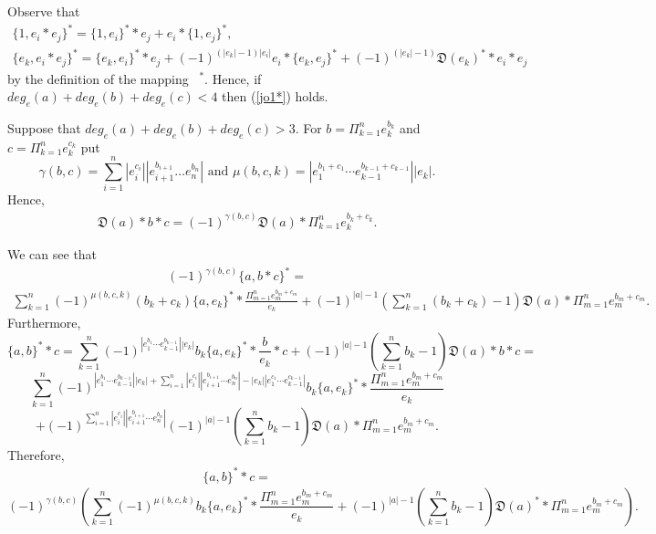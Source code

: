 \documentclass[secthm,seceqn,amsthm,ussrhead,reqno,12pt]{amsart}
\theoremstyle{plain}
\begin{document}
Observe that
\begin{gather*}
	\{1,  e_i *e_j \} ^* = \{1, e_i\}^**e_j+e_i* \{1,e_j\}^*,
	\\
	\{e_k, e_i *e_j \}^*= \{e_k,e_i\}^**e_j +(-1)^{(|e_k|-1)|e_i|} e_i* \{e_k, e_j\}^* +(-1)^{(|e_k|-1)}{\mathfrak D}(e_k)^** e_i*e_j
\end{gather*}
by the definition of the mapping~%
$^*$.
Hence,
if
$deg_e(a)+deg_e(b)+deg_e(c)<4$
then (\ref{jo1*}) holds.

Suppose that
$deg_e(a)+deg_e(b)+deg_e(c)>3$.
For
$b=\Pi_{k=1}^n e_k^{b_k}$
and
$c=\Pi_{k=1}^n e_k^{c_k}$
put
$$
\gamma(b,c)= \sum_{i=1}^n |e_i^{c_i}| |e_{i+1}^{b_{i+1}} \ldots e_{n}^{b_n}|
\mbox{ and }
\mu(b,c,k)=|e_1^{b_1+c_1}\cdots e_{k-1}^{b_{k-1}+c_{k-1}}||e_k|.
$$
Hence,
\begin{eqnarray}
	\label{jordok0}
	{\mathfrak D}(a)*b*c= (-1)^{\gamma(b,c)} {\mathfrak D}(a)*\Pi_{k=1}^n e_k^{b_k+c_k}.
\end{eqnarray}

We can see that
\begin{eqnarray}
	\label{jordok1}
	(-1)^{\gamma(b,c)}\{a,b*c\}^* =
\end{eqnarray}
\begin{eqnarray*}
	\sum_{k=1}^n 
	(-1)^{\mu(b,c,k)}
	(b_k+c_k) \{a, e_k\}^** \frac{ \Pi_{m=1}^n e_m^{b_m+c_m}}{e_k}+ 
	(-1)^{|a|-1} \left(\sum_{k=1}^n (b_k+c_k)-1\right) {\mathfrak D}(a)* \Pi_{m=1}^n e_m^{b_m+c_m}.
\end{eqnarray*}
Furthermore,
$$
\{a,b\}^**c =
\sum_{k=1}^n  
(-1)^{|e_1^{b_1}\cdots e_{k-1}^{b_{k-1}}||e_k|}
b_k\{a, e_k\}^**\frac{b}{e_k} *c +(-1)^{|a|-1} \left(\sum_{k=1}^n b_k-1\right) {\mathfrak D}(a) *  b * c=
$$
$$
\sum_{k=1}^n  
(-1)^{|e_1^{b_1}\cdots e_{k-1}^{b_{k-1}}||e_k|
	+ \sum_{i=1}^n |e_i^{c_i}| |e_{i+1}^{b_{i+1}}\cdots e_n^{b_n}|
	-|e_k||e_{1}^{c_{1}} \cdots e_{k-1}^{c_{k-1} }| }
b_k\{a, e_k\}^**\frac{\Pi_{m=1}^n e_m^{b_m+c_m}}{e_k}
$$
$$
+ (-1)^{\sum_{i=1}^n |e_i^{c_i}| |e_{i+1}^{b_{i+1}}\cdots e_n^{b_n}|} (-1)^{|a|-1} \left(\sum_{k=1}^n b_k-1\right) {\mathfrak D}(a) *  \Pi_{m=1}^n e_m^{b_m+c_m}.
$$
Therefore,
\begin{eqnarray}
	\label{jordok2}
	\{a,b\}^**c = 
\end{eqnarray}
$$
(-1)^{\gamma(b,c)} 
\left(\sum_{k=1}^n 
(-1)^{\mu(b,c,k)}
b_k \{a, e_k\}^** \frac{ \Pi_{m=1}^n e_m^{b_m+c_m}}{e_k} +(-1)^{|a|-1}  \left(\sum_{k=1}^n b_k-1\right){\mathfrak D}(a)^**  \Pi_{m=1}^n e_m^{b_m+c_m}\right).
$$
\end{document}
